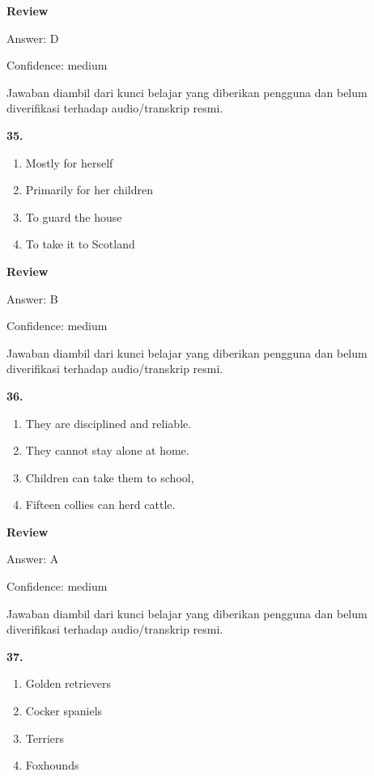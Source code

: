 \documentclass[12pt]{article}
\begin{document}
\textbf{Review}\par
Answer: D\par
Confidence: medium\par
Jawaban diambil dari kunci belajar yang diberikan pengguna dan belum diverifikasi terhadap audio/transkrip resmi.\par
\endgroup
\par
\vspace{0.25\baselineskip}
\noindent\textbf{35.}
\begin{enumerate}[label=(\Alph*),leftmargin=*,itemsep=0.2em]
\item Mostly for herself
\item Primarily for her children
\item To guard the house
\item To take it to Scotland
\end{enumerate}
\par
\begingroup
\setlength{\parskip}{0pt}
\setlength{\parindent}{0pt}
\textbf{Review}\par
Answer: B\par
Confidence: medium\par
Jawaban diambil dari kunci belajar yang diberikan pengguna dan belum diverifikasi terhadap audio/transkrip resmi.\par
\endgroup
\par
\vspace{0.25\baselineskip}
\noindent\textbf{36.}
\begin{enumerate}[label=(\Alph*),leftmargin=*,itemsep=0.2em]
\item They are disciplined and reliable.
\item They cannot stay alone at home.
\item Children can take them to school,
\item Fifteen collies can herd cattle.
\end{enumerate}
\par
\begingroup
\setlength{\parskip}{0pt}
\setlength{\parindent}{0pt}
\textbf{Review}\par
Answer: A\par
Confidence: medium\par
Jawaban diambil dari kunci belajar yang diberikan pengguna dan belum diverifikasi terhadap audio/transkrip resmi.\par
\endgroup
\par
\vspace{0.25\baselineskip}
\noindent\textbf{37.}
\begin{enumerate}[label=(\Alph*),leftmargin=*,itemsep=0.2em]
\item Golden retrievers
\item Cocker spaniels
\item Terriers
\item Foxhounds
\end{enumerate}
\end{document}
